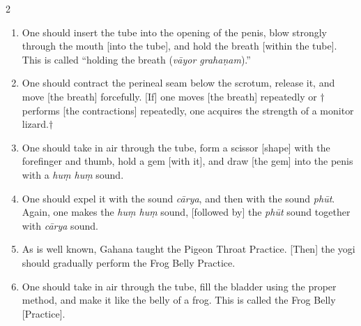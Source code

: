\begin{nohyp}
\begin{multicols}{2}
\begin{eng}
\begin{enumerate}[nosep]
\item[49.] One should insert the tube into the opening of the penis, blow strongly through the mouth [into the tube], and hold the breath [within the tube]. This is called ``holding the breath (\textit{vāyor grahaṇam}).''
\item[50.] One should contract the perineal seam below the scrotum, release it, and move [the breath] forcefully. [If] one moves [the breath] repeatedly or $\dagger$performs [the contractions] repeatedly, one acquires the strength of a monitor lizard.$\dagger$
\item[51.] One should take in air through the tube, form a scissor [shape] with the forefinger and thumb, hold a gem [with it], and draw [the gem] into the penis with a \textit{huṃ huṃ} sound.
\item[52.] One should expel it with the sound \textit{cārya}, and then with the sound \textit{phūt}. Again, one makes the \textit{huṃ huṃ} sound, [followed by] the \textit{phūt} sound together with \textit{cārya} sound.
\item[53.] As is well known, Gahana taught the Pigeon Throat Practice. [Then] the yogi should gradually perform the Frog Belly Practice.
\item[54.] One should take in air through the tube, fill the bladder using the proper method, and make it like the belly of a frog. This is called the Frog Belly [Practice].

\end{enumerate}
\end{eng}
\end{multicols}
\end{nohyp}
